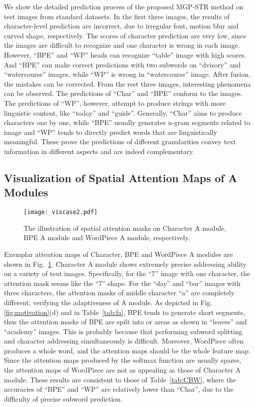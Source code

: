 \documentclass[runningheads]{llncs}
\begin{document}
We show the detailed prediction process of the proposed MGP-STR method on  test images from standard datasets. In the first three images, the results of character-level prediction are incorrect, due to irregular font, motion blur and curved shape, respectively. The scores of character prediction are very low, since the images are difficult to recognize and one character is wrong in each image. However, ``BPE'' and ``WP'' heads can recognize ``table'' image with high scores. And ``BPE'' can make correct predictions with two subwords on ``dvisory'' and ``watercourse'' images, while ``WP''  is wrong in ``watercourse'' image. After fusion, the mistakes can be corrected. From the rest three images, interesting phenomena can be observed. The predictions of ``Char'' and ``BPE''  conform to the images. The predictions of ``WP'', however, attempt to produce strings with more linguistic content, like ``today'' and ``guide''.
Generally, ``Char'' aims to produce characters one by one, while ``BPE'' usually generates n-gram segments related to image and ``WP'' tends to directly predict words that are linguistically meaningful. These prove the predictions of different granularities convey text information in different aspects and are indeed complementary.

\subsection{Visualization of Spatial Attention Maps of A Modules} 

\begin{figure}[t]\centering
 \texttt{[image: viscase2.pdf]}
 \caption{The illustration of spatial attention masks on Character A  module, BPE A  module and WordPiece A  module, respectively. }
 \label{fig:viscase}
\end{figure}

Exemplar attention maps  of Character, BPE and WordPiece A modules are shown in Fig.~\ref{fig:viscase}.
Character A module shows extremely precise addressing ability on a variety of text images.
Specifically, for the ``7'' image with one character, the attention mask seems like the ``7'' shape.
For the ``day'' and ``bar'' images with three characters, the attention masks of middle character ``a'' are  completely different, verifying the adaptiveness of A module.
As depicted in Fig.\ref{fig:motivation}(d) and in Table~\ref{tab:fa}, BPE tends to generate short segments, thus the attention masks of BPE are spilt into  or  areas as shown in ``leaves'' and ``academy'' images.
This is probably because that performing subword splitting and character addressing simultaneously is difficult.
Moreover, WordPiece often produces a whole word, and the attention maps should be the whole feature map. Since the attention maps produced by the softmax function are usually sparse, the attention maps of WordPiece are not as appealing as those of Character A module.
These results are consistent to those of Table~\ref{tab:CBW}, where the accuracies of ``BPE'' and ``WP'' are relatively lower than ``Char'', due to the difficulty of precise subword prediction. 
\end{document}
